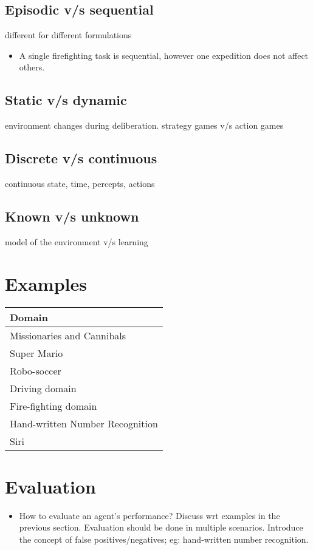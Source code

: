 \documentclass[11pt]{article}
\begin{document}
\subsection{Episodic v/s sequential}
\label{sec-2-4}

different for different formulations
\begin{itemize}
\item A single firefighting task is sequential, however one expedition
    does not affect others.
\end{itemize}
\subsection{Static v/s dynamic}
\label{sec-2-5}

environment changes during deliberation. strategy games v/s action games
\subsection{Discrete v/s continuous}
\label{sec-2-6}

continuous state, time, percepts, actions 
\subsection{Known v/s unknown}
\label{sec-2-7}

model of the environment v/s learning
\section{Examples}
\label{sec-3}


\begin{center}
\begin{tabular}{l}
 Domain                           \\
\hline
 Missionaries and Cannibals       \\
 Super Mario                      \\
 Robo-soccer                      \\
 Driving domain                   \\
 Fire-fighting domain             \\
 Hand-written Number Recognition  \\
 Siri                             \\
\end{tabular}
\end{center}
\section{Evaluation}
\label{sec-4}

\begin{itemize}
\item How to evaluate an agent's performance? Discuss wrt examples in the
  previous section. Evaluation should be done in multiple scenarios. 
  Introduce the concept of false positives/negatives; eg: hand-written
  number recognition.
\end{itemize}
\end{document}
